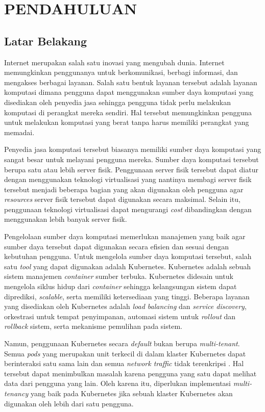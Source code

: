 \chapter{PENDAHULUAN}

\section{Latar Belakang}

Internet merupakan salah satu inovasi yang mengubah dunia. Internet
memungkinkan penggunanya untuk berkomunikasi, berbagi informasi, dan
mengakses berbagai layanan. Salah satu bentuk layanan tersebut adalah
layanan komputasi dimana pengguna dapat menggunakan sumber daya komputasi
yang disediakan oleh penyedia jasa sehingga pengguna tidak perlu melakukan
komputasi di perangkat mereka sendiri. Hal tersebut memungkinkan pengguna untuk
melakukan komputasi yang berat tanpa harus memiliki perangkat yang
memadai.

Penyedia jasa komputasi tersebut biasanya memiliki sumber daya komputasi
yang sangat besar untuk melayani pengguna mereka. Sumber daya komputasi
tersebut berupa satu atau lebih server fisik. Penggunaan server
fisik tersebut dapat diatur dengan menggunakan teknologi virtualisasi
yang nantinya membagi server fisik tersebut menjadi beberapa bagian
yang akan digunakan oleh pengguna agar \emph{resources} server fisik tersebut
dapat digunakan secara maksimal. Selain itu, penggunaan teknologi virtualisasi dapat
mengurangi \emph{cost} dibandingkan dengan menggunakan lebih banyak server fisik.

Pengelolaan sumber daya komputasi memerlukan manajemen yang baik agar sumber
daya tersebut dapat digunakan secara efisien dan sesuai dengan kebutuhan
pengguna. Untuk mengelola sumber daya komputasi tersebut, salah satu
\emph{tool} yang dapat digunakan adalah Kubernetes. Kubernetes
adalah sebuah sistem manajemen \emph{container} sumber terbuka. Kubernetes
didesain untuk mengelola siklus hidup dari \emph{container} sehingga kelangsungan
sistem dapat diprediksi, \emph{scalable}, serta memiliki ketersediaan yang tinggi.
Beberapa layanan yang disediakan oleh Kubernetes adalah \emph{load balancing} dan
\emph{service discovery}, orkestrasi untuk tempat penyimpanan, automasi sistem
untuk \emph{rollout} dan \emph{rollback} sistem, serta mekanisme pemulihan
pada sistem.

Namun, penggunaan Kubernetes secara \emph{default} bukan berupa \emph{multi-tenant}.
Semua \emph{pods} yang merupakan unit terkecil di dalam klaster Kubernetes dapat
berinteraksi satu sama lain dan semua \emph{network traffic} tidak terenkripsi \parencite{kubernetes-website-multi-tenancy}.
Hal tersebut dapat menimbulkan masalah karena pengguna yang satu dapat
melihat data dari pengguna yang lain. Oleh karena itu, diperlukan
implementasi \emph{multi-tenancy} yang baik pada Kubernetes jika
sebuah klaster Kubernetes akan digunakan oleh lebih dari satu pengguna.

